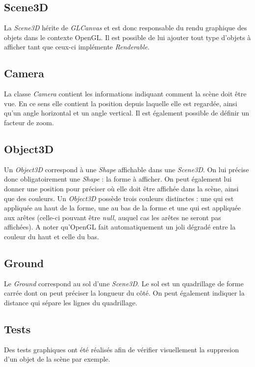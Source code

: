 \documentclass[11pt]{report}
\begin{document}
\subsection{Scene3D}

La \textit{Scene3D} hérite de \textit{GLCanvas} et est donc responsable du rendu graphique des objets dans le contexte OpenGL. Il est possible de lui ajouter tout type d'objets à afficher tant que ceux-ci implémente \textit{Renderable}.

\subsection{Camera}

La classe \textit{Camera} contient les informations indiquant comment la scène doit être vue. En ce sens elle contient la position depuis laquelle elle est regardée, ainsi qu'un angle horizontal et un angle vertical. Il est également possible de définir un facteur de zoom.

\subsection{Object3D}

Un \textit{Object3D} correspond à une \textit{Shape} affichable dans une \textit{Scene3D}. On lui précise donc obligatoirement une \textit{Shape} : la forme à afficher. On peut également lui donner une position pour préciser où elle doit être affichée dans la scène, ainsi que des couleurs. Un \textit{Object3D} possède trois couleurs distinctes : une qui est appliquée au haut de la forme, une au bas de la forme et une qui est appliquée aux arêtes (celle-ci pouvant être \textit{null}, auquel cas les arêtes ne seront pas affichées). A noter qu'OpenGL fait automatiquement un joli dégradé entre la couleur du haut et celle du bas.

\subsection{Ground}

Le \textit{Ground} correspond au sol d'une \textit{Scene3D}. Le sol est un quadrillage de forme carrée dont on peut préciser la longueur du côté. On peut également indiquer la distance qui sépare les lignes du quadrillage.

\subsection{Tests}
Des tests graphiques ont été réalisés afin de vérifier visuellement la suppresion d'un objet de la scène par exemple.
\end{document}
